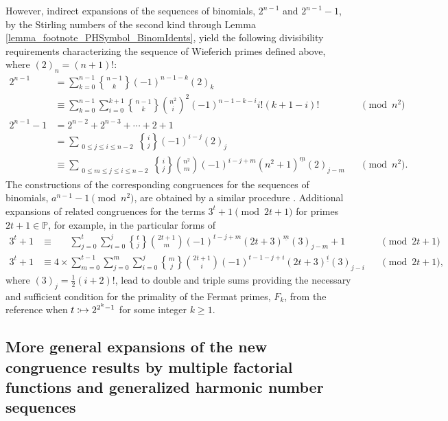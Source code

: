 \documentclass[12pt,reqno]{article}
\numberwithin{sfootnote}{section}
\numberwithin{equation}{section}
\theoremstyle{DefaultTheoremStyle}
\theoremstyle{definition}
\newcommand{\cf}[0]{cf.\ }
\newcommand{\defmapsto}{\ensuremath{\vcentcolon\mapsto}}
\newcommand{\gkpSII}[2]{\ensuremath{\genfrac{\{}{\}}{0pt}{}{#1}{#2}}}
\newcommand{\FFactII}[2]{\ensuremath{#1^{\underline{#2}}}}
\newcommand{\Pochhammer}[2]{\ensuremath{\left(#1\right)_{#2}}}
\begin{document}
However, indirect expansions of the sequences of binomials, 
$2^{n-1}$ and $2^{n-1}-1$, by the 
Stirling numbers of the second kind through 
Lemma \ref{lemma_footnote_PHSymbol_BinomIdents}, yield the following 
divisibility requirements characterizing the sequence of 
Wieferich primes defined above, where $\Pochhammer{2}{n} = (n+1)!$: 
\begin{align*} 
2^{n-1} \phantom{-1} 
     & = 
     \sum_{k=0}^{n-1} \gkpSII{n-1}{k} (-1)^{n-1-k} \Pochhammer{2}{k} && \\ 
     & \equiv 
     \sum_{k=0}^{n-1} \sum_{i=0}^{k+1} 
     \gkpSII{n-1}{k} \binom{n^2}{i}^{2} (-1)^{n-1-k-i} i! (k+1-i)! && 
     \pmod{n^2} \\ 
2^{n-1}-1 
     & = 
     2^{n-2} + 2^{n-3} + \cdots + 2 + 1 && \\ 
     & = 
     \sum_{\substack{ 0 \leq j \leq i \leq n-2}} 
     \gkpSII{i}{j} (-1)^{i-j} \Pochhammer{2}{j} && \\ 
     & \equiv 
     \sum_{\substack{ 0 \leq m \leq j \leq i \leq n-2}} 
     \gkpSII{i}{j} \binom{n^2}{m} (-1)^{i-j+m} 
     \FFactII{(n^2+1)}{m} \Pochhammer{2}{j-m} && 
     \pmod{n^2}. 
\end{align*} 
The constructions of the corresponding congruences 
for the sequences of binomials, $a^{n-1} - 1 \pmod{n^2}$, are 
obtained by a similar procedure \citep[\cf \S 5.3; Table 45]{PRIMEREC}. 
Additional expansions of related congruences for the terms 
$3^{t} + 1 \pmod{2t+1}$ for primes $2t+1 \in \mathbb{P}$, 
for example, in the particular forms of 
\begin{align*} 
3^{t} + 1 
     & \equiv 
     \phantom{4 \times} 
     \sum_{j=0}^{t} \sum_{i=0}^{j} 
     \gkpSII{t}{j} \binom{2t+1}{m} (-1)^{t-j+m} 
     \FFactII{(2t+3)}{m} \Pochhammer{3}{j-m} + 1 && 
     \pmod{2t+1} \\ 
3^{t} + 1     
     & \equiv 
     4 \times \sum_{m=0}^{t-1} \sum_{j=0}^{m} \sum_{i=0}^{j} 
     \gkpSII{m}{j} \binom{2t+1}{i} (-1)^{t-1-j+i} 
     \FFactII{(2t+3)}{i} \Pochhammer{3}{j-i} && 
     \pmod{2t+1}, 
\end{align*} 
where $\Pochhammer{3}{j} = \frac{1}{2} (i+2)!$, 
lead to double and triple sums providing the necessary and sufficient 
condition for the primality of the Fermat primes, $F_k$, 
from the reference \citep[\S 6.14]{HARDYWRIGHTNUMT} 
when $t \defmapsto 2^{2^{k}-1}$ for some integer $k \geq 1$. 


\subsection{More general expansions of the new congruence results by 
            multiple factorial functions and 
            generalized harmonic number sequences} 
\label{subsubSection_MoreGeneralExps_congruences_multiple_factfns} 
\end{document}
